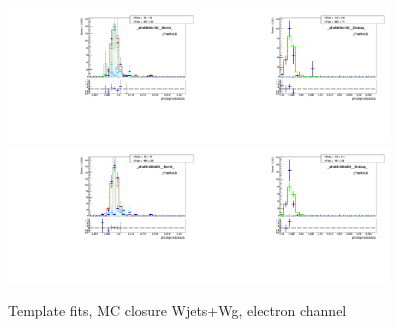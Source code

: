 \begin{figure}[htb]
\begin{center}
   \includegraphics[width=0.45\textwidth]{../figs/figs_v11/ELECTRON_WGamma/MCclosureWjetsPlusWg/c_TEMPL_SIHIH_UNblind__phoEt95to120__Barrel__RooFit_MCclosure.pdf}\includegraphics[width=0.45\textwidth]{../figs/figs_v11/ELECTRON_WGamma/MCclosureWjetsPlusWg/c_TEMPL_SIHIH_UNblind__phoEt95to120__Endcap__RooFit_MCclosure.pdf}\\
   \includegraphics[width=0.45\textwidth]{../figs/figs_v11/ELECTRON_WGamma/MCclosureWjetsPlusWg/c_TEMPL_SIHIH_UNblind__phoEt120to500__Barrel__RooFit_MCclosure.pdf}\includegraphics[width=0.45\textwidth]{../figs/figs_v11/ELECTRON_WGamma/MCclosureWjetsPlusWg/c_TEMPL_SIHIH_UNblind__phoEt120to500__Endcap__RooFit_MCclosure.pdf}\\
  \label{fig:templateFits_MCclosureWjetsPlusWg_SIHIH_ELECTRON_3}
  \caption{Template fits, MC closure Wjets+Wg, electron channel}
  \end{center}
\end{figure}
